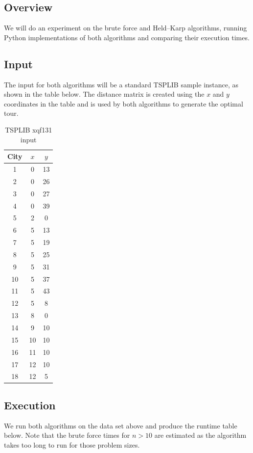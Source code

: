 \documentclass[11pt,fleqn]{article}
\begin{document}
\subsection{Overview}
We will do an experiment on the brute force and Held--Karp algorithms,
running Python implementations of both algorithms and comparing their
execution times.

\subsection{Input}
The input for both algorithms will be a standard TSPLIB sample instance, as shown
in the table below.  The distance matrix is created using the $x$ and $y$ coordinates
in the table and is used by both algorithms to generate the optimal tour.
\par

\begin{table}[H]
  \centering
  \caption*{TSPLIB xqf131 input}
  \begin{tabular}{c|c|c}
    \toprule
    City & $x$ & $y$ \\
    \midrule
    1& 0& 13 \\
    2& 0& 26 \\
    3& 0& 27 \\
    4& 0& 39 \\
    5& 2& 0\\
    6& 5& 13\\
    7& 5& 19\\
    8& 5& 25\\
    9& 5& 31\\
    10& 5& 37\\
    11& 5& 43\\ 
    12& 5& 8\\ 
    13& 8& 0\\
    14& 9& 10\\
    15& 10& 10\\
    16& 11& 10\\
    17& 12& 10\\
    18& 12& 5\\
    \bottomrule
  \end{tabular}
\end{table}

\subsection{Execution}
We run both algorithms on the data set above and produce the runtime table
below.  Note that the brute force times for $n>10$ are estimated as the
algorithm takes too long to run for those problem sizes.
\par
\end{document}
